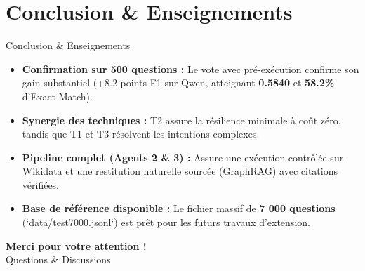 \documentclass[10pt,aspectratio=169]{beamer}
\begin{document}
\section{Conclusion \& Enseignements}

\begin{frame}{Conclusion \& Enseignements}
  \begin{itemize}
    \item \textbf{Confirmation sur 500 questions :} Le vote avec pré-exécution confirme son gain substantiel (+8.2 points F1 sur Qwen, atteignant \textbf{0.5840} et \textbf{58.2\%} d'Exact Match).
    \item \textbf{Synergie des techniques :} T2 assure la résilience minimale à coût zéro, tandis que T1 et T3 résolvent les intentions complexes.
    \item \textbf{Pipeline complet (Agents 2 \& 3) :} Assure une exécution contrôlée sur Wikidata et une restitution naturelle sourcée (GraphRAG) avec citations vérifiées.
    \item \textbf{Base de référence disponible :} Le fichier massif de \textbf{7 000 questions} (`data/test7000.jsonl`) est prêt pour les futurs travaux d'extension.
  \end{itemize}
\end{frame}

\begin{frame}[plain]
  \centering
  \Huge \textbf{Merci pour votre attention !} \\
  \vspace{0.8cm}
  \large Questions \& Discussions
\end{frame}
\end{document}
